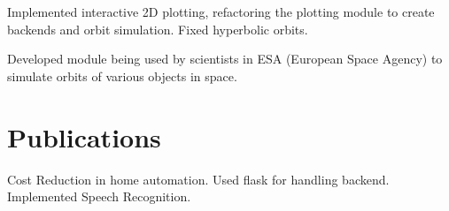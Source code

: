 \documentclass[a4paper]{deedy-resume-openfont}
\begin{document}
\begin{minipage}[t]{0.66\textwidth}
\begin{tightemize}
\item Implemented interactive 2D plotting, refactoring the plotting module to create backends and orbit simulation. Fixed hyperbolic orbits.
\item Developed module being used by scientists in ESA (European Space Agency) to simulate orbits of various objects in space.

\end{tightemize}



\section{Publications}

Cost Reduction in home automation. Used flask for handling backend. Implemented Speech Recognition.  


\end{minipage}
\end{document}
